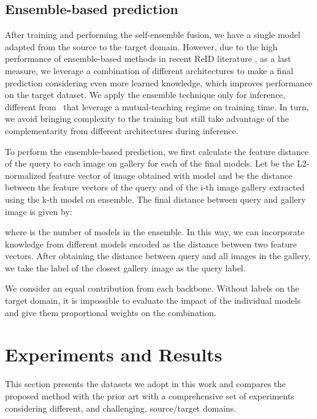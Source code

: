 \documentclass[journal]{IEEEtran}
\begin{document}
\subsection{Ensemble-based prediction}
After training and performing the self-ensemble fusion, we have a single model adapted from the source to the target domain. However, due to the high performance of ensemble-based methods in recent ReID literature \cite{ge2020mutual, zhai2020multiple}, as a last measure, we leverage a combination of  different architectures to make a final prediction considering even more learned knowledge, which improves performance on the target dataset. We apply the ensemble technique only for inference, different from~\cite{ge2020mutual, zhai2020multiple} that leverage a mutual-teaching regime on training time. In turn, we avoid bringing complexity to the training but still take advantage of the complementarity from different architectures during inference. 

To perform the ensemble-based prediction, we first calculate the feature distance of the query to each image on gallery for each of the  final models. Let  be the L2-normalized feature vector of image  obtained with model  and  be the distance between the feature vectors of the query  and of the i-th image gallery  extracted using the k-th model on ensemble. The final distance between query  and gallery image  is given by:


\noindent where  is the number of models in the ensemble. In this way, we can incorporate knowledge from different models encoded as the distance between two feature vectors. After obtaining the distance between query  and all images in the gallery, we take the label of the closest gallery image as the query label. 

We consider an equal contribution from each backbone. Without labels on the target domain, it is impossible to evaluate the impact of the individual models and give them proportional weights on the combination. 



\section{Experiments and Results}
\label{sec:experiments}

This section presents the datasets we adopt in this work and compares the proposed method with the prior art with a comprehensive set of experiments considering different, and challenging, source/target domains.
\end{document}
